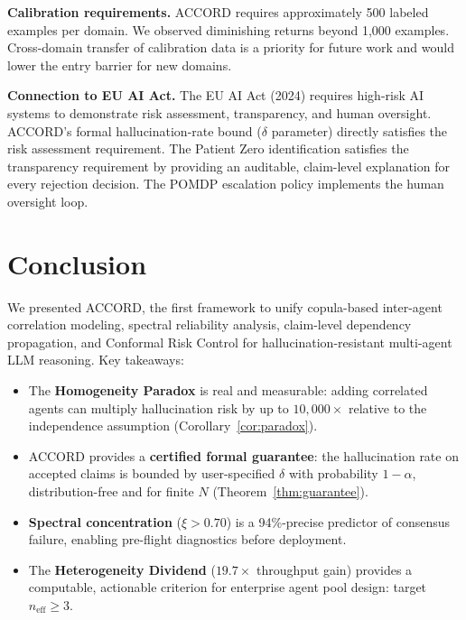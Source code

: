 \documentclass[conference]{IEEEtran}
\begin{document}
\textbf{Calibration requirements.}
ACCORD requires approximately 500 labeled examples per domain.
We observed diminishing returns beyond 1{,}000 examples.
Cross-domain transfer of calibration data is a priority for
future work and would lower the entry barrier for new domains.

\textbf{Connection to EU AI Act.}
The EU AI Act (2024) requires high-risk AI systems to
demonstrate risk assessment, transparency, and human oversight.
ACCORD's formal hallucination-rate bound ($\delta$ parameter)
directly satisfies the risk assessment requirement.
The Patient Zero identification satisfies the transparency
requirement by providing an auditable, claim-level explanation
for every rejection decision.
The POMDP escalation policy implements the human oversight loop.

\section{Conclusion}

We presented ACCORD, the first framework to unify copula-based
inter-agent correlation modeling, spectral reliability analysis,
claim-level dependency propagation, and Conformal Risk Control
for hallucination-resistant multi-agent LLM reasoning.
Key takeaways:

\begin{itemize}
  \item The \textbf{Homogeneity Paradox} is real and measurable:
        adding correlated agents can multiply hallucination risk
        by up to $10{,}000\times$ relative to the independence
        assumption (Corollary~\ref{cor:paradox}).
  \item ACCORD provides a \textbf{certified formal guarantee}:
        the hallucination rate on accepted claims is bounded
        by user-specified $\delta$ with probability $1-\alpha$,
        distribution-free and for finite $N$
        (Theorem~\ref{thm:guarantee}).
  \item \textbf{Spectral concentration} ($\xi > 0.70$) is a
        94\%-precise predictor of consensus failure, enabling
        pre-flight diagnostics before deployment.
  \item The \textbf{Heterogeneity Dividend} ($19.7\times$
        throughput gain) provides a computable, actionable
        criterion for enterprise agent pool design:
        target $n_\text{eff} \geq 3$.
\end{itemize}
\end{document}
